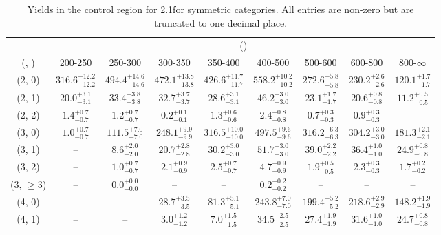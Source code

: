 \begin{table}[h!]
\tiny
\centering
\caption{Yields in the \mj control region for 2.1\ifb for symmetric categories. All entries are non-zero but are truncated to one decimal place.\label{tab:yieldssep_mu_wjetstolnuht_sym}}
\begin{tabular}
{ccccccccc}
	\hline\hline
	& \multicolumn{8}{c}{\scalht (\gev)} \\ 
	 (\njet,  \nb) & 200-250 & 250-300 & 300-350 & 350-400 & 400-500 & 500-600 & 600-800 & 800-$\infty$ \\ [0.8ex] 
\hline
	(2, 0) & $316.6^{+ 12.2 }_{- 12.2 }$ & $494.4^{+ 14.6 }_{- 14.6 }$ & $472.1^{+ 13.8 }_{- 13.8 }$ & $426.6^{+ 11.7 }_{- 11.7 }$ & $558.2^{+ 10.2 }_{- 10.2 }$ & $272.6^{+ 5.8 }_{- 5.8 }$ & $230.2^{+ 2.6 }_{- 2.6 }$ & $120.1^{+ 1.7 }_{- 1.7 }$ \\[0.5ex] 
	(2, 1) & $20.0^{+ 3.1 }_{- 3.1 }$ & $33.4^{+ 3.8 }_{- 3.8 }$ & $32.7^{+ 3.7 }_{- 3.7 }$ & $28.6^{+ 3.1 }_{- 3.1 }$ & $46.2^{+ 3.0 }_{- 3.0 }$ & $23.1^{+ 1.7 }_{- 1.7 }$ & $20.6^{+ 0.8 }_{- 0.8 }$ & $11.2^{+ 0.5 }_{- 0.5 }$ \\[0.5ex] 
	(2, 2) & $1.4^{+ 0.7 }_{- 0.7 }$ & $1.2^{+ 0.7 }_{- 0.7 }$ & $0.2^{+ 0.1 }_{- 0.1 }$ & $1.3^{+ 0.6 }_{- 0.6 }$ & $2.4^{+ 0.8 }_{- 0.8 }$ & $0.7^{+ 0.3 }_{- 0.3 }$ & $0.9^{+ 0.3 }_{- 0.3 }$ & -- \\[0.5ex] 
	(3, 0) & $1.0^{+ 0.7 }_{- 0.7 }$ & $111.5^{+ 7.0 }_{- 7.0 }$ & $248.1^{+ 9.9 }_{- 9.9 }$ & $316.5^{+ 10.0 }_{- 10.0 }$ & $497.5^{+ 9.6 }_{- 9.6 }$ & $316.2^{+ 6.3 }_{- 6.3 }$ & $304.2^{+ 3.0 }_{- 3.0 }$ & $181.3^{+ 2.1 }_{- 2.1 }$ \\[0.5ex] 
	(3, 1) & -- & $8.6^{+ 2.0 }_{- 2.0 }$ & $20.7^{+ 2.8 }_{- 2.8 }$ & $30.2^{+ 3.0 }_{- 3.0 }$ & $51.7^{+ 3.0 }_{- 3.0 }$ & $39.0^{+ 2.2 }_{- 2.2 }$ & $36.4^{+ 1.0 }_{- 1.0 }$ & $24.9^{+ 0.8 }_{- 0.8 }$ \\[0.5ex] 
	(3, 2) & -- & $1.0^{+ 0.7 }_{- 0.7 }$ & $2.1^{+ 0.9 }_{- 0.9 }$ & $2.5^{+ 0.7 }_{- 0.7 }$ & $4.7^{+ 0.9 }_{- 0.9 }$ & $1.9^{+ 0.5 }_{- 0.5 }$ & $2.3^{+ 0.3 }_{- 0.3 }$ & $1.7^{+ 0.2 }_{- 0.2 }$ \\[0.5ex] 
	(3, $\ge3$) & -- & $0.0^{+ 0.0 }_{- 0.0 }$ & -- & -- & $0.2^{+ 0.2 }_{- 0.2 }$ & -- & -- & -- \\[0.5ex] 
	(4, 0) & -- & -- & $28.7^{+ 3.5 }_{- 3.5 }$ & $81.3^{+ 5.1 }_{- 5.1 }$ & $243.8^{+ 7.0 }_{- 7.0 }$ & $199.4^{+ 5.2 }_{- 5.2 }$ & $218.6^{+ 2.9 }_{- 2.9 }$ & $148.2^{+ 1.9 }_{- 1.9 }$ \\[0.5ex] 
	(4, 1) & -- & -- & $3.0^{+ 1.2 }_{- 1.2 }$ & $7.0^{+ 1.5 }_{- 1.5 }$ & $34.5^{+ 2.5 }_{- 2.5 }$ & $27.4^{+ 1.9 }_{- 1.9 }$ & $31.6^{+ 1.0 }_{- 1.0 }$ & $24.7^{+ 0.8 }_{- 0.8 }$ \\[0.5ex] 

\end{tabular}
\end{table}
